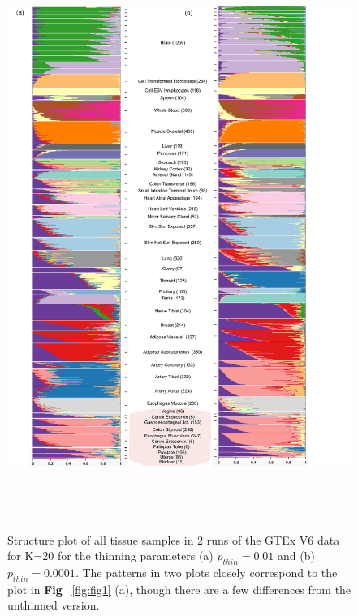     
 \begin{figure}[ht]
 \centering
\includegraphics[height=7.5in, width=6.5in]{../plots/gtex-figures/gtex_thinned_04_25_2016.pdf}
    \caption{Structure plot of all tissue samples in 2 runs of the GTEx V6 data for  K=20 for the thinning parameters (a) $p_{thin}=0.01$ and (b) $p_{thin}=0.0001$. The patterns in two plots closely correspond to the plot in \textbf{Fig} ~\ref{fig:fig1} (a), though there are a few differences from the unthinned version. }
 \label{fig:figS1}
    \end{figure}

